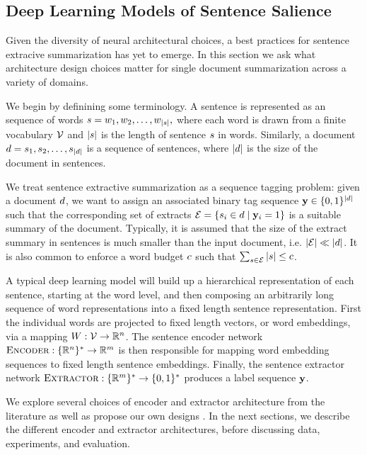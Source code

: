 

\subsection{Deep Learning Models of Sentence Salience}

 Given the diversity of neural architectural choices, a best practices
for sentence extracive summarization has yet to emerge. In this section
we ask what architecture design choices matter for single document 
summarization across a variety of domains.

We begin by definining some terminology. A sentence is represented as an
sequence of words $s = w_1, w_2, \ldots, w_{|s|},$
where each word is drawn from a finite vocabulary $\mathcal{V}$ and $|s|$ is
the length of sentence $s$ in words. Similarly, a document $d =  
s_1, s_2, \ldots, s_{|d|} $ is a sequence of sentences, where 
$|d|$ is the size of the document in sentences.  

We treat sentence extractive summarization as a sequence tagging
problem: given a document $d$, we want to assign an associated binary
tag sequence $\mathbf{y} \in \{0,1\}^{| d |}$ such that the corresponding
set of extracts $\mathcal{E} = \{s_i \in d \; | \; \mathbf{y}_i =1 \}$ is
a suitable summary
of the document. Typically, it is assumed that the size of the extract summary
in sentences is much smaller than the input document, i.e. 
$|\mathcal{E}|  \ll |d|$.
It is also common to enforce a word budget $c$ such that
$\sum_{s \in \mathcal{E}} |s| \le c$.

A typical deep learning model will build up a hierarchical representation
of each sentence, starting at the word level, and then composing an arbitrarily
long sequence of word representations into a fixed length sentence 
representation.
First the individual words are 
projected to fixed length vectors, or word embeddings, via a mapping
$W : \mathcal{V}
\rightarrow \mathbb{R}^{n}$. The sentence encoder network $\textsc{Encoder} :
\{\mathbb{R}^{n}\}^* \rightarrow \mathbb{R}^{m}$ is then 
responsible for mapping word embedding sequences to fixed length sentence 
embeddings. Finally, the sentence extractor network $\textsc{Extractor} : 
\{\mathbb{R}^m\}^* \rightarrow \{0, 1\}^*$ produces a label 
sequence $\mathbf{y}$.

We explore several choices of encoder and extractor architecture from the 
literature \citep{cheng2016neural,nallapati2016summarunner} as well as 
propose our own designs \citep{kedzie2018deep}. In the next sections,
we describe the different encoder and extractor architectures, before 
discussing data, experiments, and evaluation.

